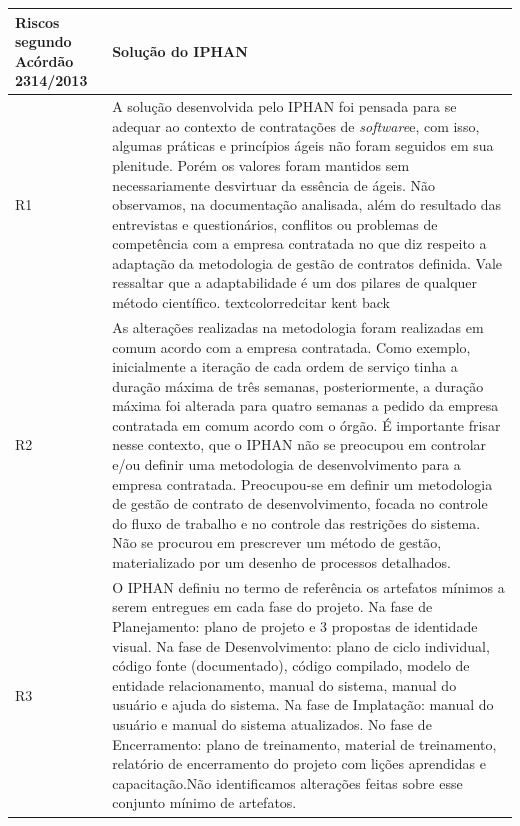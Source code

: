 \begin{longtable}{|p{2cm}|p{13cm}|}
\hline
\textbf{Riscos segundo Acórdão 2314/2013}                                                  & \textbf{Solução do IPHAN}                       \\ \hline
R1                                                                & A solução desenvolvida pelo IPHAN foi pensada para se adequar ao contexto de contratações de \textit{software}e, com isso, algumas práticas e princípios ágeis não foram seguidos em sua plenitude. Porém os valores foram mantidos sem necessariamente desvirtuar da essência de ágeis. Não observamos, na documentação analisada, além do resultado das entrevistas e questionários, conflitos ou problemas de competência com a empresa contratada no que diz respeito a adaptação da metodologia de gestão de contratos definida. Vale ressaltar que a adaptabilidade é um dos pilares de qualquer método científico. textcolor{red}{citar kent back}          \\ \hline
R2                                                                &  As alterações realizadas na metodologia foram realizadas em comum acordo com a empresa contratada. Como exemplo, inicialmente a iteração de cada ordem de serviço tinha a duração máxima de três semanas, posteriormente, a duração máxima foi alterada para quatro semanas a pedido da empresa contratada em comum acordo com o órgão. É importante frisar nesse contexto, que o IPHAN não se preocupou em controlar e/ou definir uma metodologia de desenvolvimento para a empresa contratada. Preocupou-se em definir um metodologia de gestão de contrato de desenvolvimento, focada no controle do fluxo de trabalho e no controle das restrições do sistema. Não se procurou em prescrever um método de gestão, materializado por um desenho de processos detalhados.               \\ \hline
R3                                                                & O IPHAN definiu no termo de referência os artefatos mínimos a serem entregues em cada fase do projeto. Na fase de Planejamento: plano de projeto e 3 propostas de identidade visual. Na fase de Desenvolvimento: plano de ciclo individual, código fonte (documentado), código compilado, modelo de entidade relacionamento, manual do sistema, manual do usuário e ajuda do sistema. Na fase de Implatação: manual do usuário e manual do sistema atualizados. No fase de Encerramento: plano de treinamento, material de treinamento, relatório de encerramento do projeto com lições aprendidas e capacitação.Não identificamos alterações feitas sobre esse conjunto mínimo de artefatos.       \\ \hline

\end{longtable}
